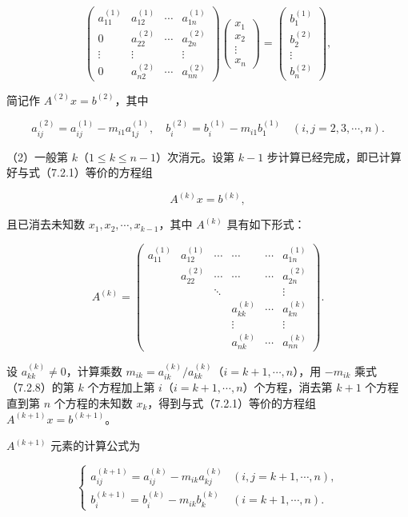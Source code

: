 \[
\begin{pmatrix}
a_{11}^{(1)}&a_{12}^{(1)}&\cdots&a_{1n}^{(1)}\\
0&a_{22}^{(2)}&\cdots&a_{2n}^{(2)}\\
\vdots&\vdots&&\vdots\\
0&a_{n2}^{(2)}&\cdots&a_{nn}^{(2)}
\end{pmatrix}
\begin{pmatrix}x_1\\x_2\\\vdots\\x_n\end{pmatrix}
=\begin{pmatrix}b_1^{(1)}\\b_2^{(2)}\\\vdots\\b_n^{(2)}\end{pmatrix},
\tag{7.2.7}
\]

简记作 \(A^{(2)}x=b^{(2)}\)，其中

\[
a_{ij}^{(2)}=a_{ij}^{(1)}-m_{i1}a_{1j}^{(1)},\quad
b_i^{(2)}=b_i^{(1)}-m_{i1}b_1^{(1)}\quad(i,j=2,3,\cdots,n).
\]

（2）一般第 \(k\)（\(1\le k\le n-1\)）次消元。设第 \(k-1\) 步计算已经完成，即已计算好与式（7.2.1）等价的方程组

\[A^{(k)}x=b^{(k)},\tag{7.2.8}\]

且已消去未知数 \(x_1,x_2,\cdots,x_{k-1}\)，其中 \(A^{(k)}\) 具有如下形式：

\[
A^{(k)}=\begin{pmatrix}
a_{11}^{(1)}&a_{12}^{(1)}&\cdots&\cdots&\cdots&a_{1n}^{(1)}\\
&a_{22}^{(2)}&\cdots&\cdots&\cdots&a_{2n}^{(2)}\\
&&\ddots&&&\vdots\\
&&&a_{kk}^{(k)}&\cdots&a_{kn}^{(k)}\\
&&&\vdots&&\vdots\\
&&&a_{nk}^{(k)}&\cdots&a_{nn}^{(k)}
\end{pmatrix}.
\]

设 \(a_{kk}^{(k)}\ne0\)，计算乘数 \(m_{ik}=a_{ik}^{(k)}/a_{kk}^{(k)}\)（\(i=k+1,\cdots,n\)），用 \(-m_{ik}\) 乘式（7.2.8）的第 \(k\) 个方程加上第 \(i\)（\(i=k+1,\cdots,n\)）个方程，消去第 \(k+1\) 个方程直到第 \(n\) 个方程的未知数 \(x_k\)，得到与式（7.2.1）等价的方程组 \(A^{(k+1)}x=b^{(k+1)}\)。

\(A^{(k+1)}\) 元素的计算公式为

\[
\begin{cases}
a_{ij}^{(k+1)}=a_{ij}^{(k)}-m_{ik}a_{kj}^{(k)}& (i,j=k+1,\cdots,n),\\
b_i^{(k+1)}=b_i^{(k)}-m_{ik}b_k^{(k)}& (i=k+1,\cdots,n).
\end{cases}
\tag{7.2.9}
\]

